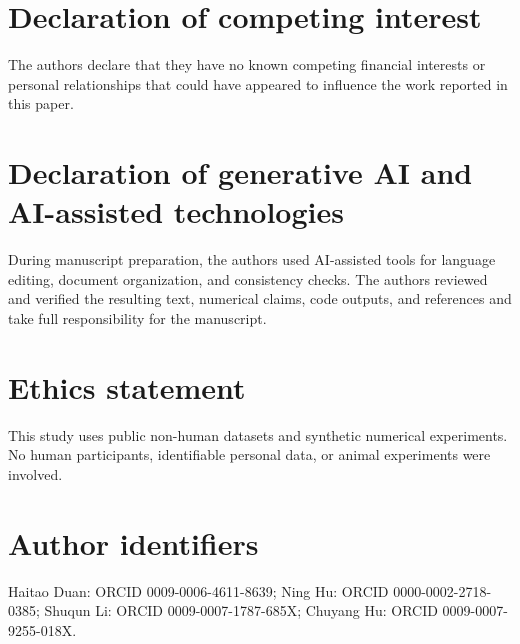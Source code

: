 \documentclass[11pt]{article}
\begin{document}
\section*{Declaration of competing interest}
The authors declare that they have no known competing financial interests or personal relationships that could have appeared to influence the work reported in this paper.

\section*{Declaration of generative AI and AI-assisted technologies}
During manuscript preparation, the authors used AI-assisted tools for language editing, document organization, and consistency checks. The authors reviewed and verified the resulting text, numerical claims, code outputs, and references and take full responsibility for the manuscript.

\section*{Ethics statement}
This study uses public non-human datasets and synthetic numerical experiments. No human participants, identifiable personal data, or animal experiments were involved.

\section*{Author identifiers}
Haitao Duan: ORCID 0009-0006-4611-8639; Ning Hu: ORCID 0000-0002-2718-0385; Shuqun Li: ORCID 0009-0007-1787-685X; Chuyang Hu: ORCID 0009-0007-9255-018X.



\end{document}
